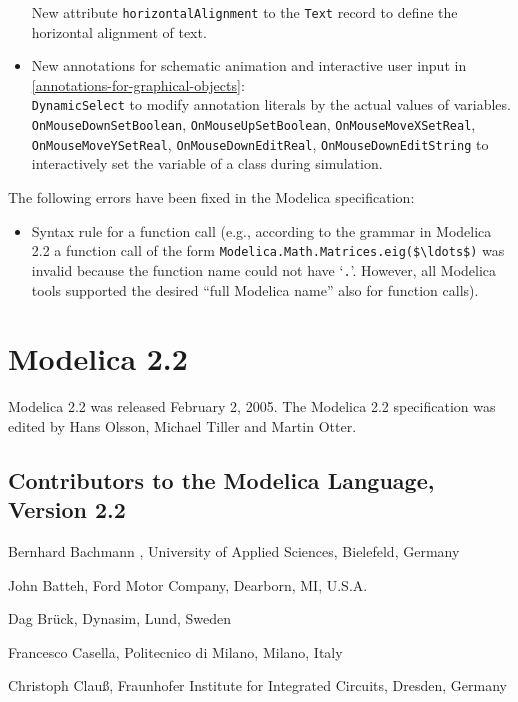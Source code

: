 \begin{itemize}
  New attribute \lstinline!horizontalAlignment! to the \lstinline!Text! record to define the horizontal alignment of text.
\item
  New annotations for schematic animation and interactive user input in
  \cref{annotations-for-graphical-objects}:\\
  \lstinline!DynamicSelect! to modify annotation literals by the actual values of variables.\\
  \lstinline!OnMouseDownSetBoolean!, \lstinline!OnMouseUpSetBoolean!, \lstinline!OnMouseMoveXSetReal!,
  \lstinline!OnMouseMoveYSetReal!, \lstinline!OnMouseDownEditReal!, \lstinline!OnMouseDownEditString! to
  interactively set the variable of a class during simulation.
\end{itemize}

The following errors have been fixed in the Modelica specification:
\begin{itemize}
\item
  Syntax rule for a function call (e.g., according to the grammar in
  Modelica 2.2 a function call of the form
  \lstinline!Modelica.Math.Matrices.eig($\ldots$)! was invalid because the function name
  could not have `\lstinline!.!'. However, all Modelica tools supported the
  desired ``full Modelica name'' also for function calls).
\end{itemize}

\section{Modelica 2.2}\label{modelica-2-2}

Modelica 2.2 was released February 2, 2005. The Modelica 2.2
specification was edited by Hans Olsson, Michael Tiller and Martin
Otter.

\subsection{Contributors to the Modelica Language, Version 2.2}\label{contributors-to-the-modelica-language-version-2-2}

\indent\indent
Bernhard Bachmann , University of Applied Sciences, Bielefeld, Germany

John Batteh, Ford Motor Company, Dearborn, MI, U.S.A.

Dag Brück, Dynasim, Lund, Sweden

Francesco Casella, Politecnico di Milano, Milano, Italy

Christoph Clauß, Fraunhofer Institute for Integrated Circuits, Dresden,
Germany

